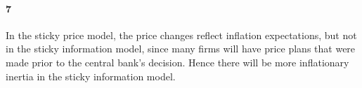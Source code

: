 \documentclass[10pt,letter]{article}
\newcommand{\problempart}[1]{\paragraph{#1}}
\begin{document}
\problempart{7}
In the sticky price model, the price changes reflect inflation expectations, but not in the sticky information model, since many firms will have price plans that were made prior to the central bank's decision. Hence there will be more inflationary inertia in the sticky information model.
\end{document}
